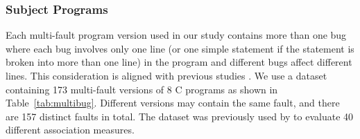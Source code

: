 %
%

\subsubsection{Subject Programs}\label{sec.exp.subject2}

Each multi-fault program version used in our study contains more than one bug where each bug involves only one line (or one simple statement if the statement is broken into more than one line) in the program and different bugs affect different lines. This consideration is aligned with previous studies \citep[e.g.][]{zhang2013bridging,Abreu:2009.jss}. We use a dataset containing 173 multi-fault versions of 8 C programs as shown in Table~\ref{tab:multibug}. Different versions may contain the same fault, and there are 157 distinct faults in total. The dataset was previously used by \cite{lucia2013} to evaluate 40 different association measures.


